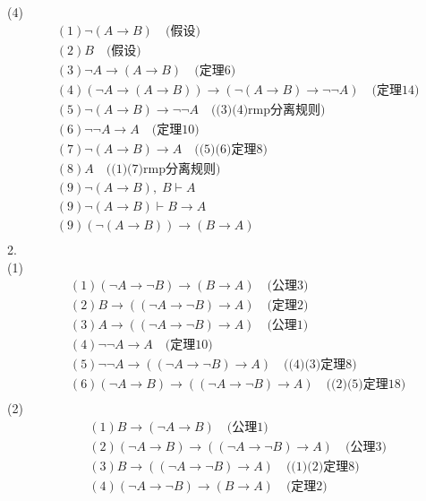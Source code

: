 \documentclass{article}
\begin{document}
(4)
\[
\begin{aligned}
&(1)\neg (A \to B) \quad \mbox{(假设)}\\
&(2)B \quad \mbox{(假设)} \\
&(3)\neg A \to (A \to B) \quad \mbox{(定理6)} \\
&(4)(\neg A \to (A \to B)) \to (\neg (A \to B) \to \neg \neg A)\quad \mbox{(定理14)} \\
&(5)\neg (A \to B) \to \neg \neg A \quad \mbox{((3)(4)rmp分离规则)} \\
&(6)\neg \neg A \to A \quad \mbox{(定理10)}\\
&(7)\neg (A \to B) \to A \quad \mbox{((5)(6)定理8)}\\
&(8)A \quad \mbox{((1)(7)rmp分离规则)}\\
&(9)\neg (A \to B),\; B \vdash A\\
&(9)\neg (A \to B) \vdash B \to A \\
&(9)(\neg (A \to B)) \to (B \to A) \\
\end{aligned}
\]
2.\\
(1)
\[
\begin{aligned}
&(1)(\neg A \to \neg B) \to (B \to A) \quad \mbox{(公理3)}\\
&(2)B \to ((\neg A \to \neg B) \to A) \quad \mbox{(定理2)} \\
&(3)A \to ((\neg A \to \neg B) \to A)\quad \mbox{(公理1)} \\
&(4)\neg \neg A \to A \quad \mbox{(定理10)} \\
&(5)\neg \neg A \to ((\neg A \to \neg B) \to A) \quad \mbox{((4)(3)定理8)} \\
&(6)(\neg A \to B) \to ((\neg A \to \neg B) \to A) \quad \mbox{((2)(5)定理18)} \\
\end{aligned}
\]
(2)
\[
\begin{aligned}
&(1)B \to (\neg A \to B) \quad \mbox{(公理1)}\\
&(2)(\neg A \to B) \to ((\neg A \to \neg B) \to A) \quad \mbox{(公理3)} \\
&(3)B \to ((\neg A \to \neg B) \to A) \quad \mbox{((1)(2)定理8)} \\
&(4)(\neg A \to \neg B) \to (B \to A) \quad \mbox{(定理2)} \\
\end{aligned}
\]
\end{document}
